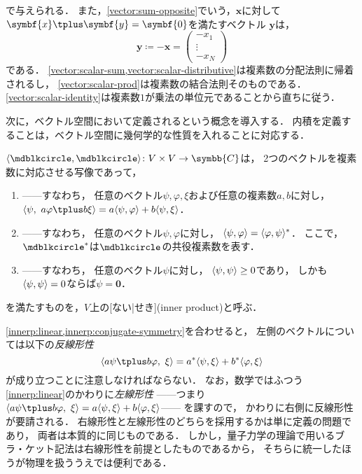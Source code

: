 \documentclass{sotsu}
\newcommand{\fire}[1]{\textcolor{fire}{#1}}
\begin{document}
で与えられる．
また，\cref{vector:sum-opposite}でいう，$\symbf{x}$に対して$\symbf{x} \vecplus \symbf{y} = \symbf{0}$を満たすベクトル
$\symbf{y}$は，
\begin{equation*}
    \symbf{y} \coloneq 
    -\symbf{x} =
    \begin{pmatrix}
        -x_1  \\  \vdots  \\  -x_N
    \end{pmatrix}
\end{equation*}
である．
\cref{vector:scalar-sum,vector:scalar-distributive}は複素数の分配法則に帰着されるし，
\cref{vector:scalar-prod}は複素数の結合法則そのものである．
\cref{vector:scalar-identity}は複素数$1$が乗法の単位元であることから直ちに従う．


\clearpage



次に，ベクトル空間において定義されるという概念を導入する．
内積を定義することは，ベクトル空間に幾何学的な性質を入れることに対応する．

$\iparen{\bigdot, \bigdot} \colon V \times V \to \symbb{C}$は，
2つのベクトルを複素数に対応させる写像であって，
\begin{enumerate}
    \item \label{innerp:linear} 
        ------すなわち，
        \fire{任意のベクトル$\psi, \varphi, \xi$}および\fire{任意の複素数$a, b$}に対し，
        $\iparen{\psi, \  a \varphi \vecplus b \xi} = a \iparen{\psi, \varphi} + b \iparen{\psi, \xi}$．
    \item \label{innerp:conjugate-symmetry} 
        ------すなわち，
        \fire{任意のベクトル$\psi, \varphi$}に対し，
        $\iparen{\psi, \varphi} = \conj{\iparen{\varphi, \psi}}$．
        ここで，$\conj{\bigdot}$は$\bigdot$の共役複素数を表す．
    \item \label{innerp:positive-definiteness}
        ------すなわち，
        \fire{任意のベクトル$\psi$}に対し，
        $\langle \psi, \psi \rangle \geq 0$であり，
        しかも$\langle \psi, \psi \rangle = 0$ならば$\psi = \symbf{0}$．
\end{enumerate}
を満たすものを，$V$上の[ない|せき](inner product)と呼ぶ．

\cref{innerp:linear,innerp:conjugate-symmetry}を合わせると，
左側のベクトルについては以下の\emph{反線形性}
\begin{equation*}
    \iparen{a \psi \vecplus b \varphi, \  \xi}
        = \conj{a} \iparen{\psi, \xi} + \conj{b} \iparen{\varphi, \xi}
\end{equation*}
が成り立つことに注意しなければならない．
なお，数学ではふつう\cref{innerp:linear}のかわりに\emph{左線形性}%
------つまり\(
    \iparen{a \psi \vecplus b \varphi, \  \xi}
    = a \iparen{\psi, \xi} + b \iparen{\varphi, \xi}
\)------%
を課すので，
かわりに右側に反線形性が要請される．
右線形性と左線形性のどちらを採用するかは単に定義の問題であり，
両者は本質的に同じものである．
しかし，量子力学の理論で用いるブラ・ケット記法は右線形性を前提としたものであるから，
そちらに統一したほうが物理を扱ううえでは便利である．
\end{document}

